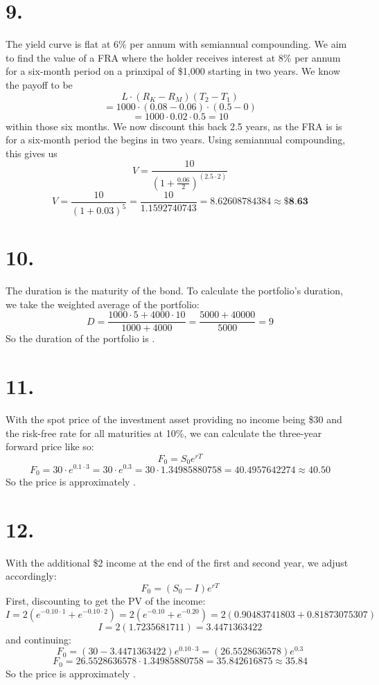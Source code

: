\documentclass{article}
\begin{document}
{\Large 

\section*{9.}

The yield curve is flat at 6\% per annum with semiannual compounding. We aim to find the value of a FRA where the holder receives interest at 8\% per annum for a six-month period on a prinxipal of \$1,000 starting in two years. We know the payoff to be 
\[
  L \cdot (R_K - R_M)(T_2 - T_1)
\]
\[
  = 1000 \cdot (0.08 - 0.06) \cdot (0.5 - 0)
\]
\[
  = 1000 \cdot 0.02 \cdot 0.5 = 10
\]
within those six months. We now discount this back 2.5 years, as the FRA is is for a six-month period the begins in two years. Using semiannual compounding, this gives us
\[
  V = \frac{10}{(1 + \frac{0.06}{2})^(2.5 \cdot 2)}
\]
\[
  V = \frac{10}{(1 + 0.03)^5} = \frac{10}{1.1592740743} = 8.62608784384 \approx \boxed{\textbf{\$8.63}}
\]

}
{\Large 

\section*{10.}

The duration is the maturity of the bond. To calculate the portfolio's duration, we take the weighted average of the portfolio:
\[
  D = \frac{1000 \cdot 5 + 4000 \cdot 10}{1000 + 4000} = \frac{5000 + 40000}{5000} = 9
\]
So the duration of the portfolio is .

}
{\Large 

\section*{11.}

With the spot price of the investment asset providing no income being \$30 and the risk-free rate for all maturities at 10\%, we can calculate the three-year forward price like so: 
\[
  F_0 = S_0e^{rT}
\]
\[
  F_0 = 30 \cdot e^{0.1 \cdot 3} = 30 \cdot e^{0.3} = 30 \cdot 1.34985880758 = 40.4957642274 \approx 40.50
\]
So the price is approximately .

}
{\Large 

\section*{12.}

With the additional \$2 income at the end of the first and second year, we adjust accordingly:
\[
  F_0 = (S_0 - I)e^{rT}
\]
First, discounting to get the PV of the income:
\[
  I = 2(e^{-0.10 \cdot 1} + e^{-0.10 \cdot 2}) = 2(e^{-0.10} + e^{-0.20}) = 2(0.90483741803 + 0.81873075307)
\]
\[
  I = 2(1.7235681711) = 3.4471363422
\]
and continuing:
\[
  F_0 = (30 - 3.4471363422)e^{0.10 \cdot 3} = (26.5528636578)e^{0.3} 
\]
\[
  F_0 = 26.5528636578 \cdot 1.34985880758 = 35.842616875 \approx 35.84
\]
So the price is approximately .

}
\end{document}
